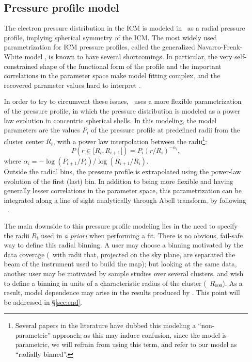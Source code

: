 \subsection{Pressure profile model} \label{sec:algo:press}

The electron pressure distribution in the ICM is modeled in \panco\ as a radial pressure profile, implying spherical symmetry of the ICM.
The most widely used parametrization for ICM pressure profiles, called the generalized Navarro-Frenk-White model \citep[gNFW,][]{zhao_analytical_1996, nagai_effects_2007}, is known to have several shortcomings.
In particular, the very self-constrained shape of the functional form of the profile and the important correlations in the parameter space make model fitting complex, and the recovered parameter values hard to interpret \citep[see \eg][]{nagai_effects_2007, battaglia_cluster_2012-1, sayers_evolution_2022}.

In order to try to circumvent these issues, \panco\ uses a more flexible parametrization of the pressure profile, in which the pressure distribution is modeled as a power law evolution in concentric spherical shells.
In this modeling, the model parameters are the values $P_i$ of the pressure profile at predefined radii from the cluster center $R_i$, with a power law interpolation between the radii\footnote{Several papers in the literature have dubbed this modeling a ``non-parametric'' approach; as this may induce confusion, since the model is parametric, we will refrain from using this term, and refer to our model as ``radially binned''.}:
\begin{equation}
    \label{eq:algo:pressure_profile}
    P(r \in [R_i, R_{i+1}[) = P_i \left(r / R_i\right)^{-\alpha_i},
\end{equation}
where $\alpha_i = - \log(P_{i+1} / P_i) / \log(R_{i+1} / R_i)$. \\
Outside the radial bins, the pressure profile is extrapolated using the power-law evolution of the first (last) bin.
In addition to being more flexible and having generally lesser correlations in the parameter space, this parametrization can be integrated along a line of sight analytically through Abell transform, by following \eg\ \citet{romero_multi-instrument_2018}.

The main downside to this pressure profile modeling lies in the need to specify the radii $R_i$ used in  \textit{a priori} when performing a fit.
There is no obvious, fail-safe way to define this radial binning.
A user may choose a binning motivated by the data coverage (\eg\ with radii that, projected on the sky plane, are separated the beam of the instrument used to build the map); but looking at the same data, another user may be motivated by sample studies over several clusters, and wish to define a binning in units of a characteristic radius of the cluster (\eg\ $R_{500}$).
As a result, model dependence may arise in the results produced by \panco.
This point will be addressed in \S\ref{sec:end}.

